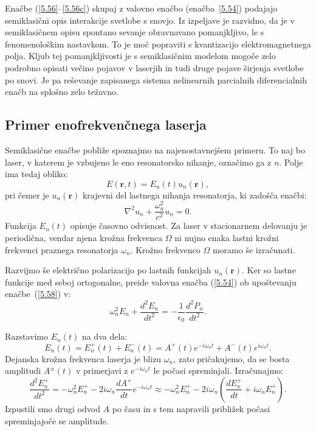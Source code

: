 Enačbe (\ref{5.56}--\ref{5.56c}) skupaj z valovno enačbo (enačba~\ref{5.54}) podajajo
semiklasični opis interakcije svetlobe s snovjo. Iz izpeljave je razvidno, da
je v semiklasičnem opisu spontano sevanje obravnavano pomanjkljivo, le s fenomenološkim
nastavkom. To je moč popraviti s kvantizacijo elektromagnetnega polja. 
Kljub tej pomanjkljivosti je s semiklasičnim modelom mogoče zelo podrobno opisati 
večino pojavov v laserjih in tudi druge pojave širjenja svetlobe po snovi. Je pa 
reševanje zapisanega sistema nelinearnih parcialnih diferencialnih enačb  
na splošno zelo težavno.

\subsection*{Primer enofrekvenčnega laserja}
Semiklasične enačbe pobliže spoznajmo na najenostavnejšem primeru. To naj bo laser, 
v katerem je vzbujeno le eno resonatorsko nihanje, označimo ga z $n$.
Polje ima tedaj obliko:
\begin{equation}  
\label{5.57}
E(\mathbf{r},t)= E_n(t)u_n(\mathbf{r}),
\end{equation}
pri čemer je $u_n(\mathbf{r})$ krajevni del lastnega nihanja resonatorja, ki
zadošča enačbi:
\begin{equation}  
\label{5.58}
\nabla^2 u_n+\frac{\omega_n^2}{c^2}u_n=0.
\end{equation}
Funkcija $E_n(t)$ opisuje časovno odvisnost. Za laser v stacionarnem
delovanju je periodična, vendar njena krožna frekvenca $\Omega$ ni nujno enaka lastni
krožni frekvenci praznega resonatorja $\omega_n$. Krožno frekvenco 
$\Omega$ moramo še izračunati.

Razvijmo še električno polarizacijo po lastnih funkcijah $u_n(\mathbf{r})$. 
Ker so lastne funkcije med seboj ortogonalne, preide valovna enačba (\ref{5.54}) 
ob upoštevanju enačbe~(\ref{5.58}) v:
\begin{equation}  
\label{5.59}
\omega_n^2 E_n+\frac{d^2 E_n}{dt^2}= 
-\frac{1}{\epsilon_0}\frac{d^2P_n}{dt^2}.
\end{equation}

Razstavimo $E_n(t)$ na dva dela: 
\begin{equation}  \label{5.60}
E_n(t)=E_n^+(t)+E_n^-(t)=A^+(t)e^{-i
\omega_nt}+A^-(t)e^{i \omega_nt}.
\end{equation}
Dejanska krožna frekvenca laserja je blizu $\omega_n$, zato pričakujemo,
da se bosta amplitudi $A^{\pm}(t)$ v primerjavi z $e^{-i \omega_nt}$ le
počasi spreminjali. Izračunajmo:
\begin{equation}  
\label{5.61}
\frac{d^2 E_n^+}{dt^2}=-\omega_n^2 E_n^+ - 2i \omega_n 
\frac{dA^+}{dt} e^{-i \omega_nt} \approx 
-\omega_n^2 E_n^+-2i \omega_n\left(\frac{dE_n^+}{dt}+
i \omega_nE_n^+\right)\!\!.
\end{equation}
Izpustili smo drugi odvod $A$ po času in s tem napravili približek počasi spreminjajoče se amplitude.

